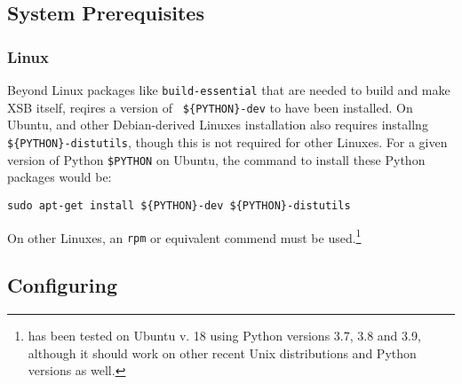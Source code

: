 
\subsection{System Prerequisites}

\subsubsection{Linux}


Beyond Linux packages like {\tt build-essential} that are needed to
build and make XSB itself, \px{} reqires a version of {\tt
  \$\{PYTHON\}-dev} to have been installed.  On Ubuntu, and other
Debian-derived Linuxes installation also requires installng {\tt
  \$\{PYTHON\}-distutils}, though this is not required for other
Linuxes. For a given version of Python {\tt \$PYTHON} on Ubuntu, the
command to install these Python packages would be:

{\tt sudo apt-get install \$\{PYTHON\}-dev \$\{PYTHON\}-distutils}

On other Linuxes, an {\tt rpm} or equivalent commend must be
used.\footnote{\px{} has been tested on Ubuntu v. 18 using Python
  versions 3.7, 3.8 and 3.9, although it should work on other recent
  Unix distributions and Python versions as well.}



\subsection{Configuring \px{}}

